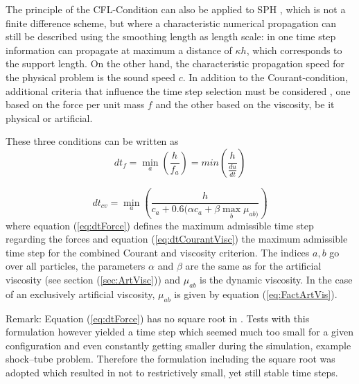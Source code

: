 \documentclass[11pt,a4paper,twoside]{report}
\begin{document}
The principle of the CFL-Condition can also be applied to SPH \cite{Monaghan1989}, which is not a finite difference scheme, but where a characteristic numerical propagation can still be described using the smoothing length as length scale: in one time step information can propagate at maximum a distance of $\kappa h$, which corresponds to the support length. On the other hand, the characteristic propagation speed for the physical problem is the sound speed $c$. 
In addition to the Courant-condition, additional criteria that influence the time step selection must be considered \cite{Monaghan1992}, one based on the force per unit mass $f$ and the other based on the viscosity, be it physical or artificial.

These three conditions can be written as \cite{Monaghan1989,Monaghan1992}
\begin{equation}
\label{eq:dtForce}
 dt_f=\min_a\left(\frac{h}{f_a}\right)=min\left(\frac{h}{\frac{du}{dt}}\right)
\end{equation}

\begin{equation}
\label{eq:dtCourantVisc}
 dt_{cv}=\min_a\left(\frac{h}{c_a+0.6(\alpha c_a+\beta \max_b \mu_{ab)}}\right)
\end{equation}
where equation (\ref{eq:dtForce}) defines the maximum admissible time step regarding the forces and equation (\ref{eq:dtCourantVisc}) the maximum admissible time step for the combined Courant and viscosity criterion. The indices $a,b$ go over all particles, the parameters $\alpha$ and $\beta$ are the same as for the artificial viscosity (see section (\ref{sec:ArtVisc})) and $\mu_{ab}$ is the dynamic viscosity. In the case of an exclusively artificial viscosity, $\mu_{ab}$ is given by equation (\ref{eq:FactArtVis}).

Remark: Equation (\ref{eq:dtForce}) has no square root in \cite{Monaghan1992}. Tests with this formulation however yielded a time step which seemed much too small for a given configuration and even constantly getting smaller during the simulation, example shock--tube problem. Therefore the formulation including the square root \cite{Monaghan1989} was adopted which resulted in not to restrictively small, yet still stable time steps.

\end{document}
